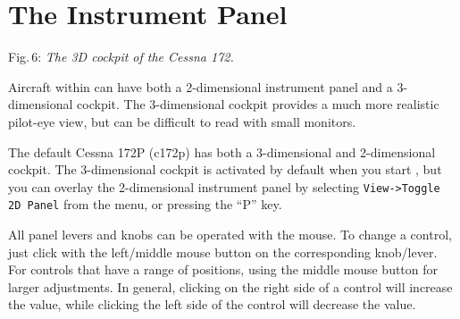 \section{The Instrument Panel}

 \centerline{}

\smallskip
 \noindent
Fig.\,6: \textit{The 3D cockpit of the Cessna 172.}
\medskip

Aircraft within \FlightGear{} can have both a 2-dimensional instrument panel
and a 3-dimensional cockpit. The 3-dimensional cockpit provides a much
more realistic pilot-eye view, but can be difficult to read with small
monitors.

The default Cessna 172P (c172p) has both a 3-dimensional and 2-dimensional
cockpit. The 3-dimensional cockpit is activated by default when you start
\FlightGear{}, but you can overlay the 2-dimensional instrument panel by
selecting \texttt{View->Toggle 2D Panel} from the menu, or pressing the ``P'' key.

All panel levers and knobs can be operated with the mouse. To change a
control, just click with the left/middle mouse button on the
corresponding knob/lever. For controls that have a range of positions,
using the middle mouse button for larger adjustments. In general, clicking
on the right side of a control will increase the value, while clicking the left side
of the control will decrease the value.

